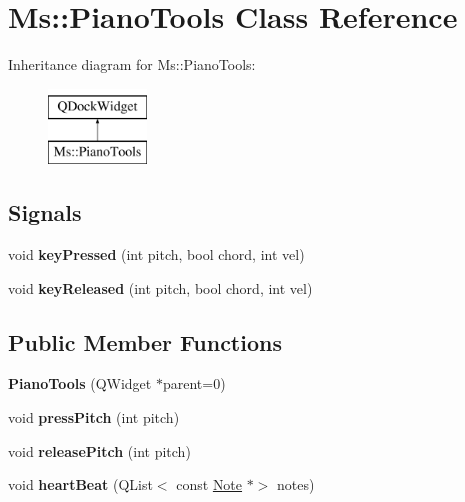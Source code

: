 \hypertarget{class_ms_1_1_piano_tools}{}\section{Ms\+:\+:Piano\+Tools Class Reference}
\label{class_ms_1_1_piano_tools}
Inheritance diagram for Ms\+:\+:Piano\+Tools\+:\begin{figure}[H]
\begin{center}
\leavevmode
\includegraphics[height=2.000000cm]{class_ms_1_1_piano_tools}
\end{center}
\end{figure}
\subsection*{Signals}
\begin{DoxyCompactItemize}
\item 
\mbox{\label{class_ms_1_1_piano_tools_abff061d4da9d15e7ad92417bee7e01e2}} 
void {\bfseries key\+Pressed} (int pitch, bool chord, int vel)
\item 
\mbox{\label{class_ms_1_1_piano_tools_a7c675475c9fcae2862867ecdda353e34}} 
void {\bfseries key\+Released} (int pitch, bool chord, int vel)
\end{DoxyCompactItemize}
\subsection*{Public Member Functions}
\begin{DoxyCompactItemize}
\item 
\mbox{\label{class_ms_1_1_piano_tools_a345299ccd5bc56f0d2500c6443e9a5eb}} 
{\bfseries Piano\+Tools} (Q\+Widget $\ast$parent=0)
\item 
\mbox{\label{class_ms_1_1_piano_tools_af4de35d3ee026f969625ed6fe7e151e4}} 
void {\bfseries press\+Pitch} (int pitch)
\item 
\mbox{\label{class_ms_1_1_piano_tools_a3da3a3f06e5d46f578f71bb89df46528}} 
void {\bfseries release\+Pitch} (int pitch)
\item 
\mbox{\label{class_ms_1_1_piano_tools_acf7a17338f42b5aba62c604327998e3e}} 
void {\bfseries heart\+Beat} (Q\+List$<$ const \hyperlink{class_ms_1_1_note}{Note} $\ast$$>$ notes)
\end{DoxyCompactItemize}
